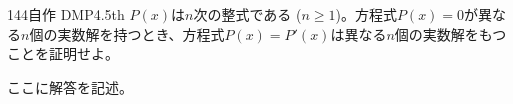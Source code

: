 \begin{thm}{144}{}{自作 DMP4.5th}
 $P(x)$は$n$次の整式である ($n\ge 1$)。方程式$P(x)=0$が異なる$n$個の実数解を持つとき、方程式$P(x)=P'(x)$は異なる$n$個の実数解をもつことを証明せよ。
\end{thm}

ここに解答を記述。